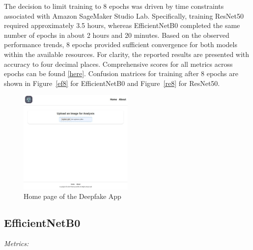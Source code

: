 \documentclass[conference]{IEEEtran}
\begin{document}
The decision to limit training to 8 epochs was driven by time constraints associated with Amazon SageMaker Studio Lab. Specifically, training ResNet50 required approximately 3.5 hours, whereas EfficientNetB0 completed the same number of epochs in about 2 hours and 20 minutes. Based on the observed performance trends, 8 epochs provided sufficient convergence for both models within the available resources. For clarity, the reported results are presented with accuracy to four decimal places. Comprehensive scores for all metrics across epochs can be found \href{https://github.com/konradwojda/HYU-AI-G08/tree/main/results}{[here]}. Confusion matrices for training after 8 epochs are shown in Figure~\ref{ef8} for EfficientNetB0 and Figure~\ref{re8} for ResNet50. 

\begin{figure}[ht]
\centering
\includegraphics[width=0.5\textwidth]{basic.jpg}
\caption{Home page of the Deepfake App}
\label{basic}
\end{figure} 

\subsection*{EfficientNetB0}
\textit{Metrics:}  

\begin{center}
\end{center}
\end{document}
